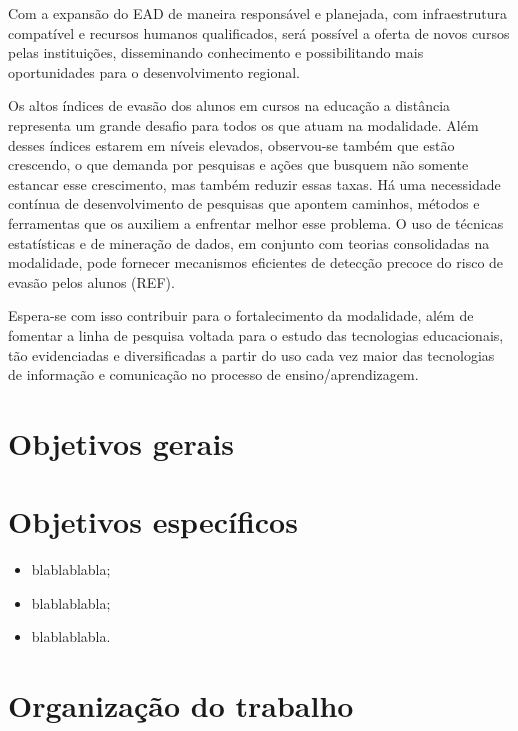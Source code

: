 Com a expansão do EAD de maneira responsável e planejada, com infraestrutura
compatível e recursos humanos qualificados, será possível a oferta de novos
cursos pelas instituições, disseminando conhecimento e possibilitando mais
oportunidades para o desenvolvimento regional.

Os altos índices de evasão dos alunos em cursos na educação a distância
representa um grande desafio para todos os que atuam na modalidade. Além desses
índices estarem em níveis elevados, observou-se também que estão crescendo, o
que demanda por pesquisas e ações que busquem não somente estancar esse
crescimento, mas também reduzir essas taxas. Há uma necessidade contínua de
desenvolvimento de pesquisas que apontem caminhos, métodos e ferramentas que os
auxiliem a enfrentar melhor esse problema. O uso de técnicas estatísticas e de
mineração de dados, em conjunto com teorias consolidadas na modalidade, pode
fornecer mecanismos eficientes de detecção precoce do risco de evasão pelos
alunos (REF).

Espera-se com isso contribuir para o fortalecimento da modalidade, além de
fomentar a linha de pesquisa voltada para o estudo das tecnologias educacionais,
tão evidenciadas e diversificadas a partir do uso cada vez maior das tecnologias
de informação e comunicação no processo de ensino/aprendizagem.

\section{Objetivos gerais}

\lipsum[1]

\section{Objetivos específicos}

\begin{itemize}
	\item blablablabla;
    \item blablablabla;
    \item blablablabla.
\end{itemize}

\section{Organização do trabalho}

\lipsum[10-12]
